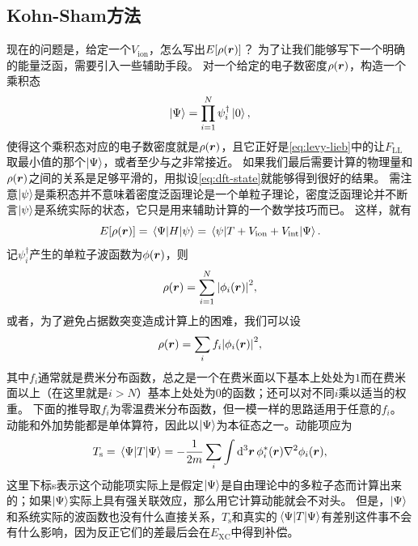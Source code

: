 \subsection{Kohn-Sham方法}

现在的问题是，给定一个$V_\text{ion}$，怎么写出$E[\rho(\vb*{r})]$？
为了让我们能够写下一个明确的能量泛函，需要引入一些辅助手段。
对一个给定的电子数密度$\rho(\vb*{r})$，构造一个乘积态
\begin{equation}
    \ket{\Psi} = \prod_{i=1}^N {\psi}^\dagger_i \ket{0},
    \label{eq:dft-state}
\end{equation}
使得这个乘积态对应的电子数密度就是$\rho(\vb*{r})$，且它正好是\eqref{eq:levy-lieb}中的让$F_\text{LL}$取最小值的那个$\ket{\Psi}$，或者至少与之非常接近。
如果我们最后需要计算的物理量和$\rho(\vb*{r})$之间的关系是足够平滑的，用拟设\eqref{eq:dft-state}就能够得到很好的结果。
需注意$\ket{\psi}$是乘积态并不意味着密度泛函理论是一个单粒子理论，密度泛函理论并不断言$\ket{\psi}$是系统实际的状态，它只是用来辅助计算的一个数学技巧而已。
这样，就有%
\begin{equation}
    E[\rho(\vb*{r})] = \mel{\Psi}{{H}}{\psi} = \mel{\psi}{{T} + {V}_\text{ion} + {V}_\text{int}}{\Psi}.
\end{equation}
记${\psi}_i^\dagger$产生的单粒子波函数为$\phi(\vb*{r})$，则
\begin{equation}
    \rho(\vb*{r}) = \sum_{i=1}^N \abs{\phi_i(\vb*{r})}^2,
    \label{eq:kohn-sham-density}
\end{equation}
或者，为了避免占据数突变造成计算上的困难，我们可以设
\begin{equation}
    \rho(\vb*{r}) = \sum_i f_i \abs{\phi_i(\vb*{r})}^2,
\end{equation}
其中$f_i$通常就是费米分布函数，总之是一个在费米面以下基本上处处为$1$而在费米面以上（在这里就是$i > N$）基本上处处为$0$的函数；还可以对不同$i$乘以适当的权重。
下面的推导取$f_i$为零温费米分布函数，但一模一样的思路适用于任意的$f_i$。
动能和外加势能都是单体算符，因此以$\ket{\Psi}$为本征态之一。动能项应为
\begin{equation}
    T_\text{s} = \mel{\Psi}{{T}}{\Psi} = - \frac{1}{2m} \sum_i \int \dd[3]{\vb*{r}} \phi_i^*(\vb*{r}) \laplacian \phi_i(\vb*{r}),
\end{equation}
这里下标s表示这个动能项实际上是假定$\ket{\Psi}$是自由理论中的多粒子态而计算出来的；如果$\ket{\Psi}$实际上具有强关联效应，那么用它计算动能就会不对头。
但是，$\ket{\Psi}$和系统实际的波函数也没有什么直接关系，$T_\text{s}$和真实的$\mel*{\Psi}{T}{\Psi}$有差别这件事不会有什么影响，因为反正它们的差最后会在$E_\text{XC}$中得到补偿。
